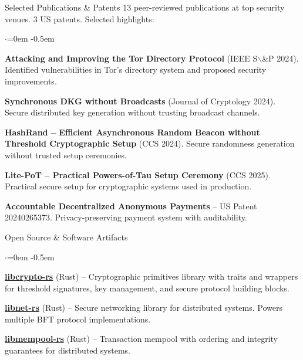 \documentclass{resume}
\begin{document}
\begin{rSection}{Selected Publications \& Patents}
\label{sec:org32ec125}
\vspace{0.5em}
13 peer-reviewed publications at top security venues. 3 US patents. Selected highlights:
\begin{list}{$\cdot$}{\leftmargin=0em}
\itemsep -0.5em \vspace{-0.5em}
 \item  \textbf{Attacking and Improving the Tor Directory Protocol} (IEEE S$\backslash$&P 2024). Identified vulnerabilities in Tor's directory system and proposed security improvements.
 \item  \textbf{Synchronous DKG without Broadcasts} (Journal of Cryptology 2024). Secure distributed key generation without trusting broadcast channels.
 \item  \textbf{HashRand -- Efficient Asynchronous Random Beacon without Threshold Cryptographic Setup} (CCS 2024). Secure randomness generation without trusted setup ceremonies.
 \item  \textbf{Lite-PoT -- Practical Powers-of-Tau Setup Ceremony} (CCS 2025). Practical secure setup for cryptographic systems used in production.
 \item  \textbf{Accountable Decentralized Anonymous Payments} -- US Patent 20240265373. Privacy-preserving payment system with auditability.
\end{list}
\vspace{0.5em}
\end{rSection}
\begin{rSection}{Open Source \& Software Artifacts}
\label{sec:org53d9adb}
\vspace{0.5em}
\begin{list}{$\cdot$}{\leftmargin=0em}
\itemsep -0.5em \vspace{-0.5em}
 \item  \textbf{\href{https://github.com/libdist-rs/libcrypto-rs}{libcrypto-rs}} (Rust) -- Cryptographic primitives library with traits and wrappers for threshold signatures, key management, and secure protocol building blocks.
 \item  \textbf{\href{https://github.com/libdist-rs/libnet-rs}{libnet-rs}} (Rust) -- Secure networking library for distributed systems. Powers multiple BFT protocol implementations.
 \item  \textbf{\href{https://github.com/libdist-rs/libmempool-rs}{libmempool-rs}} (Rust) -- Transaction mempool with ordering and integrity guarantees for distributed systems.
\end{list}
\end{rSection}
\end{document}
